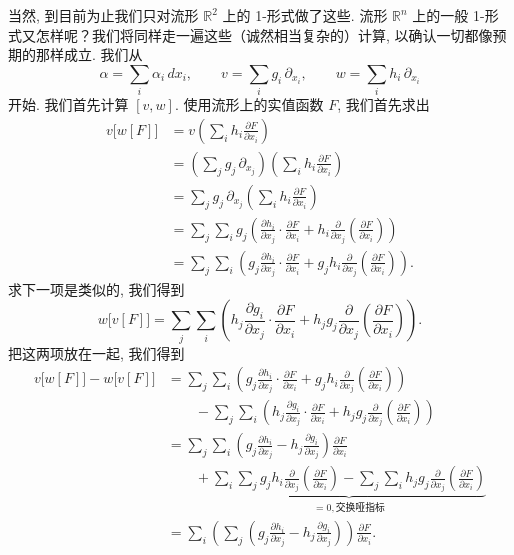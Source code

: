当然, 到目前为止我们只对流形 $\mathbb{R}^2$ 上的 1-形式做了这些. 流形 $\mathbb{R}^n$ 上的一般 1-形式又怎样呢？我们将同样走一遍这些（诚然相当复杂的）计算, 以确认一切都像预期的那样成立. 我们从
\[
\alpha=\sum_i\alpha_i\,dx_i,\qquad
v=\sum_i g_i\,\partial_{x_i},\qquad
w=\sum_i h_i\,\partial_{x_i}
\]
开始. 我们首先计算 $[v,w]$. 使用流形上的实值函数 $F$, 我们首先求出
\begin{align*}
v\bigl[w[F]\bigr]&=v\left(\sum_i h_i\frac{\partial F}{\partial x_i}\right)\\
&=\left(\sum_j g_j\,\partial_{x_j}\right)\left(\sum_i h_i\frac{\partial F}{\partial x_i}\right)\\
&=\sum_j g_j\,\partial_{x_j}\left(\sum_i h_i\frac{\partial F}{\partial x_i}\right)\\
&=\sum_j\sum_i g_j\left(\frac{\partial h_i}{\partial x_j}\cdot\frac{\partial F}{\partial x_i}
+h_i\frac{\partial}{\partial x_j}\left(\frac{\partial F}{\partial x_i}\right)\right)\\
&=\sum_j\sum_i\left(g_j\frac{\partial h_i}{\partial x_j}\cdot\frac{\partial F}{\partial x_i}
+g_jh_i\frac{\partial}{\partial x_j}\left(\frac{\partial F}{\partial x_i}\right)\right).
\end{align*}
求下一项是类似的, 我们得到
\[
w\bigl[v[F]\bigr]=\sum_j\sum_i\left(h_j\frac{\partial g_i}{\partial x_j}\cdot\frac{\partial F}{\partial x_i}
+h_jg_j\frac{\partial}{\partial x_j}\left(\frac{\partial F}{\partial x_i}\right)\right).
\]
把这两项放在一起, 我们得到
\begin{align*}
v\bigl[w[F]\bigr]-w\bigl[v[F]\bigr]
&=\sum_j\sum_i\left(g_j\frac{\partial h_i}{\partial x_j}\cdot\frac{\partial F}{\partial x_i}
+g_jh_i\frac{\partial}{\partial x_j}\left(\frac{\partial F}{\partial x_i}\right)\right)\\
&\qquad-\sum_j\sum_i\left(h_j\frac{\partial g_i}{\partial x_j}\cdot\frac{\partial F}{\partial x_i}
+h_jg_j\frac{\partial}{\partial x_j}\left(\frac{\partial F}{\partial x_i}\right)\right)\\
&=\sum_j\sum_i\left(g_j\frac{\partial h_i}{\partial x_j}-h_j\frac{\partial g_i}{\partial x_j}\right)\frac{\partial F}{\partial x_i}\\
&\qquad+\underbrace{\sum_i\sum_j g_jh_i\frac{\partial}{\partial x_j}\left(\frac{\partial F}{\partial x_i}\right)
-\sum_j\sum_i h_jg_j\frac{\partial}{\partial x_j}\left(\frac{\partial F}{\partial x_i}\right)}_{=0, \text{交换哑指标}}\\
&=\sum_i\left(\sum_j\left(g_j\frac{\partial h_i}{\partial x_j}-h_j\frac{\partial g_i}{\partial x_j}\right)\right)\frac{\partial F}{\partial x_i}.
\end{align*}
